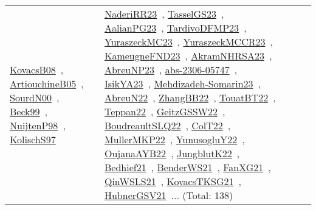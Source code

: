 {\begin{longtable}{lp{3cm}>{\raggedright\arraybackslash}p{6cm}>{\raggedright\arraybackslash}p{6cm}>{\raggedright\arraybackslash}p{8cm}}
\href{works/KovacsB08.pdf}{KovacsB08}~\cite{KovacsB08}, \href{works/ArtiouchineB05.pdf}{ArtiouchineB05}~\cite{ArtiouchineB05}, \href{works/SourdN00.pdf}{SourdN00}~\cite{SourdN00}, \href{works/Beck99.pdf}{Beck99}~\cite{Beck99}, \href{works/NuijtenP98.pdf}{NuijtenP98}~\cite{NuijtenP98}, \href{works/KolischS97.pdf}{KolischS97}~\cite{KolischS97} & \href{works/NaderiRR23.pdf}{NaderiRR23}~\cite{NaderiRR23}, \href{works/TasselGS23.pdf}{TasselGS23}~\cite{TasselGS23}, \href{works/AalianPG23.pdf}{AalianPG23}~\cite{AalianPG23}, \href{works/TardivoDFMP23.pdf}{TardivoDFMP23}~\cite{TardivoDFMP23}, \href{works/YuraszeckMC23.pdf}{YuraszeckMC23}~\cite{YuraszeckMC23}, \href{works/YuraszeckMCCR23.pdf}{YuraszeckMCCR23}~\cite{YuraszeckMCCR23}, \href{works/KameugneFND23.pdf}{KameugneFND23}~\cite{KameugneFND23}, \href{works/AkramNHRSA23.pdf}{AkramNHRSA23}~\cite{AkramNHRSA23}, \href{works/AbreuNP23.pdf}{AbreuNP23}~\cite{AbreuNP23}, \href{works/abs-2306-05747.pdf}{abs-2306-05747}~\cite{abs-2306-05747}, \href{works/IsikYA23.pdf}{IsikYA23}~\cite{IsikYA23}, \href{works/Mehdizadeh-Somarin23.pdf}{Mehdizadeh-Somarin23}~\cite{Mehdizadeh-Somarin23}, \href{works/AbreuN22.pdf}{AbreuN22}~\cite{AbreuN22}, \href{works/ZhangBB22.pdf}{ZhangBB22}~\cite{ZhangBB22}, \href{works/TouatBT22.pdf}{TouatBT22}~\cite{TouatBT22}, \href{works/Teppan22.pdf}{Teppan22}~\cite{Teppan22}, \href{works/GeitzGSSW22.pdf}{GeitzGSSW22}~\cite{GeitzGSSW22}, \href{works/BoudreaultSLQ22.pdf}{BoudreaultSLQ22}~\cite{BoudreaultSLQ22}, \href{works/ColT22.pdf}{ColT22}~\cite{ColT22}, \href{works/MullerMKP22.pdf}{MullerMKP22}~\cite{MullerMKP22}, \href{works/YunusogluY22.pdf}{YunusogluY22}~\cite{YunusogluY22}, \href{works/OujanaAYB22.pdf}{OujanaAYB22}~\cite{OujanaAYB22}, \href{works/JungblutK22.pdf}{JungblutK22}~\cite{JungblutK22}, \href{works/Bedhief21.pdf}{Bedhief21}~\cite{Bedhief21}, \href{works/BenderWS21.pdf}{BenderWS21}~\cite{BenderWS21}, \href{works/FanXG21.pdf}{FanXG21}~\cite{FanXG21}, \href{works/QinWSLS21.pdf}{QinWSLS21}~\cite{QinWSLS21}, \href{works/KovacsTKSG21.pdf}{KovacsTKSG21}~\cite{KovacsTKSG21}, \href{works/HubnerGSV21.pdf}{HubnerGSV21}~\cite{HubnerGSV21}... (Total: 138)\\

\end{longtable}}
